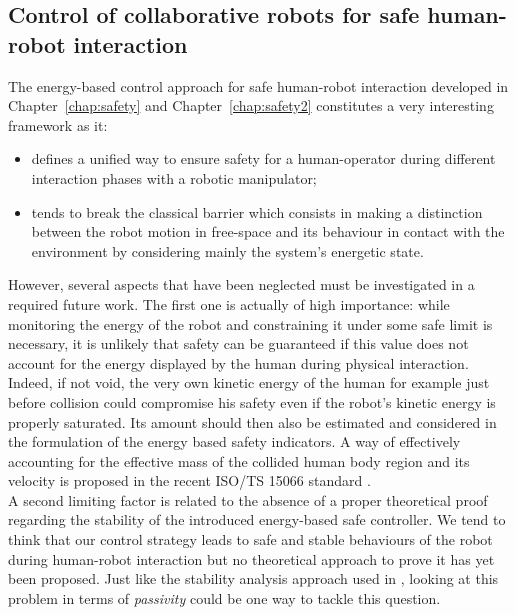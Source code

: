 \subsection{Control of collaborative robots for safe human-robot interaction}
The energy-based control approach for safe human-robot interaction developed in Chapter~\ref{chap:safety} and Chapter~\ref{chap:safety2} constitutes a very interesting framework as it:
\begin{itemize}
\item defines a unified way to ensure safety for a human-operator during different interaction phases with a robotic manipulator;
\item tends to break the classical barrier which consists in making a distinction between the robot motion in free-space and its behaviour in contact with the environment by considering mainly the system's energetic state. 
\end{itemize}
However, several aspects that have been neglected must be investigated in a required future work. The first one is actually of high importance: while monitoring the energy of the robot and constraining it under some safe limit is necessary, it is unlikely that safety can be guaranteed if this value does not account for the energy displayed by the human during physical interaction. Indeed, if not void, the very own kinetic energy of the human for example just before collision could compromise his safety even if the robot's kinetic energy is properly saturated. Its amount should then also be estimated and considered in the formulation of the energy based safety indicators. A way of effectively accounting for the effective mass of the collided human body region and its velocity is proposed in the recent ISO/TS 15066 standard \cite{ISO15066PDF}. \\A second limiting factor is related to the absence of a proper theoretical proof regarding the stability of the introduced energy-based safe controller. We tend to think that our control strategy leads to safe and stable behaviours of the robot during human-robot interaction but no theoretical approach to prove it has yet been proposed. Just like the stability analysis approach used in \cite{schindlbeck2015unified}, looking at this problem in terms of \textit{passivity} could be one way to tackle this question. 
